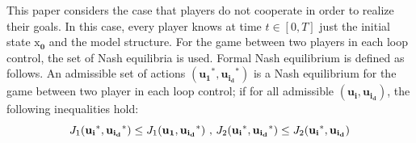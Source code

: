 \documentclass[conference]{IEEEtran}
\begin{document}
This paper considers the case that players do not cooperate in order to realize their goals.
In this case, every player knows at time $t \in [0, T]$ just the initial state $\boldsymbol{\mathrm{x}_0}$ and the model structure.
For the game between two players in each loop control, the set of Nash equilibria is used. Formal Nash equilibrium is defined as follows.
An admissible set of actions $(\boldsymbol{u_1}^*,  \boldsymbol{u_{i_d}}^*)$ is a Nash equilibrium for the game between two player in each loop control; if for all admissible $(\boldsymbol{u_i},  \boldsymbol{u_{i_d}})$, the following inequalities hold:
\begin{equation}\label{nash_lqe}
	J_1(\boldsymbol{\mathrm{u_i}}^*, \boldsymbol{\mathrm{u_{i_d}}}^*)\leq J_1(\boldsymbol{\mathrm{u_1}}, \boldsymbol{\mathrm{u_{i_d}}}^*) \text{\rm{ , }}
	J_2(\boldsymbol{\mathrm{u_i}}^*, \boldsymbol{\mathrm{u_{i_d}}}^*)\leq 
	J_2(\boldsymbol{\mathrm{u_i}}^*, \boldsymbol{\mathrm{u_{i_d}}})
\end{equation}
\end{document}

